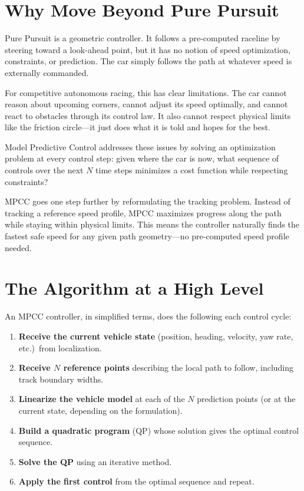 \documentclass[12pt,a4paper]{article}
\begin{document}
\section{Why Move Beyond Pure Pursuit}

Pure Pursuit is a geometric controller. It follows a pre-computed raceline by steering toward a look-ahead point, but it has no notion of speed optimization, constraints, or prediction. The car simply follows the path at whatever speed is externally commanded.

For competitive autonomous racing, this has clear limitations. The car cannot reason about upcoming corners, cannot adjust its speed optimally, and cannot react to obstacles through its control law. It also cannot respect physical limits like the friction circle---it just does what it is told and hopes for the best.

Model Predictive Control addresses these issues by solving an optimization problem at every control step: given where the car is now, what sequence of controls over the next $N$ time steps minimizes a cost function while respecting constraints?

MPCC goes one step further by reformulating the tracking problem. Instead of tracking a reference speed profile, MPCC maximizes progress along the path while staying within physical limits. This means the controller naturally finds the fastest safe speed for any given path geometry---no pre-computed speed profile needed.

\section{The Algorithm at a High Level}

An MPCC controller, in simplified terms, does the following each control cycle:

\begin{enumerate}
    \item \textbf{Receive the current vehicle state} (position, heading, velocity, yaw rate, etc.)\ from localization.
    \item \textbf{Receive $N$ reference points} describing the local path to follow, including track boundary widths.
    \item \textbf{Linearize the vehicle model} at each of the $N$ prediction points (or at the current state, depending on the formulation).
    \item \textbf{Build a quadratic program} (QP) whose solution gives the optimal control sequence.
    \item \textbf{Solve the QP} using an iterative method.
    \item \textbf{Apply the first control} from the optimal sequence and repeat.
\end{enumerate}
\end{document}
